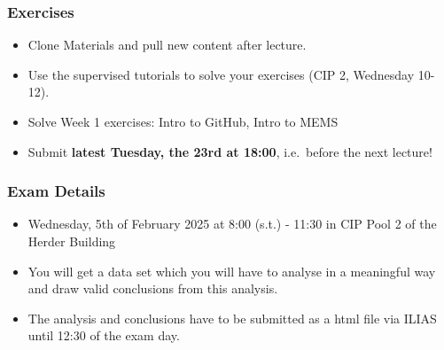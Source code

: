 \documentclass{beamer}
\begin{document}
\begin{frame}
\frametitle{Exercises}


\begin{itemize}
    \item Clone Materials and pull new content after lecture.
    \item Use the supervised tutorials to solve your exercises (CIP 2, Wednesday 10-12).
    \item Solve Week 1 exercises: Intro to GitHub, Intro to MEMS
    \item Submit \textbf{latest Tuesday, the 23rd at 18:00}, i.e.~before the next lecture!
\end{itemize}
\vspace{2em}

\end{frame}

\begin{frame}
\frametitle{Exam Details}
\begin{itemize}
    \item Wednesday, 5th of February 2025 at 8:00 (s.t.) - 11:30 in CIP Pool 2 of the Herder Building
    \item You will get a data set which you will have to analyse in a meaningful way and draw valid conclusions from this analysis.
    \item The analysis and conclusions have to be submitted as a html file via ILIAS until 12:30 of the exam day.
\end{itemize}
\vspace{2em}
\begin{center}
    \textbf{\color{red}{Register for the exam latest on 1st of February! }}
\end{center}
\end{frame}
\end{document}
